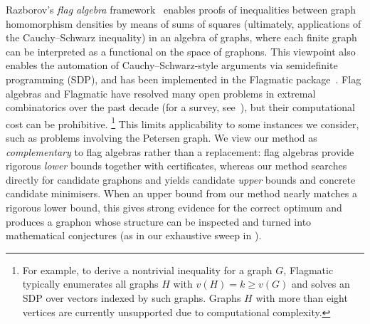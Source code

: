 \documentclass{article}
\theoremstyle{plain}
\theoremstyle{definition}
\theoremstyle{remark}
\begin{document}
Razborov's \emph{flag algebra} framework~\citep{razborov2007flag} enables proofs of inequalities between graph homomorphism densities by means of sums of squares (ultimately, applications of the Cauchy--Schwarz inequality) in an algebra of graphs, where each finite graph can be interpreted as a functional on the space of graphons. This viewpoint also enables the automation of Cauchy--Schwarz-style arguments via semidefinite programming (SDP), and has been implemented in the {\sc Flagmatic} package~\citep{falgas2013applications}.
Flag algebras and Flagmatic have resolved many open problems in extremal combinatorics over the past decade (for a survey, see~\citet{razborov2013flag}), but their computational cost can be prohibitive. \footnote{For example, to derive a nontrivial inequality for a graph $G$, {\sc Flagmatic} typically enumerates all graphs $H$ with $v(H) = k \geq v(G)$ and solves an SDP over vectors indexed by such graphs. Graphs $H$ with more than eight vertices are currently unsupported due to computational complexity.}
This limits applicability to some instances we consider, such as problems involving the Petersen graph.
We view our method as \emph{complementary} to flag algebras rather than a replacement: flag algebras provide rigorous \emph{lower} bounds together with certificates, whereas our method searches directly for candidate graphons and yields candidate \emph{upper} bounds and concrete candidate minimisers. When an upper bound from our method nearly matches a rigorous lower bound, this gives strong evidence for the correct optimum and produces a graphon whose structure can be inspected and turned into mathematical conjectures (as in our exhaustive sweep in ).
\end{document}
